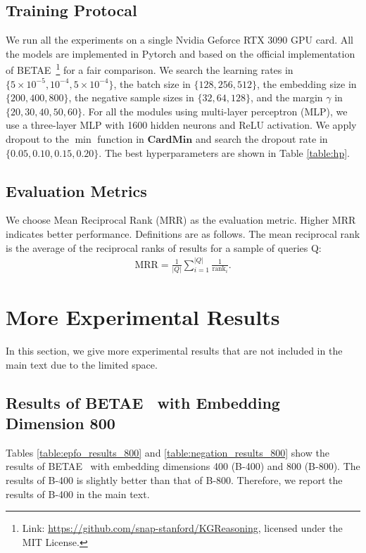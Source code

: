 \documentclass{article}
\newcommand{\betae}{{\normalsize{B}\footnotesize{ETA}\normalsize{E}}}
\begin{document}
\subsection{Training Protocal}
We run all the experiments on a single Nvidia Geforce RTX 3090 GPU card. All the models are implemented in Pytorch \cite{pytorch} and based on the official implementation of \betae~\cite{beta}\footnote{Link: \url{https://github.com/snap-stanford/KGReasoning}, licensed under the MIT License.} for a fair comparison. We search the learning rates in $\{5\times 10^{-5}, 10^{-4}, 5\times 10^{-4}\}$, the batch size in $\{128,256,512\}$, the embedding size in $\{200,400,800\}$, the negative sample sizes in $\{32,64,128\}$, and the margin $\gamma$ in $\{20,30,40,50,60\}$. For all the modules using multi-layer perceptron (MLP), we use a three-layer MLP with 1600 hidden neurons and ReLU activation. We apply dropout to the $\min$ function in $\textbf{CardMin}$ and search the dropout rate in $\{0.05,0.10,0.15,0.20\}$. The best hyperparameters are shown in Table \ref{table:hp}.

\subsection{Evaluation Metrics}
We choose Mean Reciprocal Rank (MRR) as the evaluation metric. Higher MRR  indicates better performance. Definitions are as follows. The mean reciprocal rank is the average of the reciprocal ranks of results for a sample of queries Q:
\begin{align*}
    \text{MRR}=\frac{1}{|Q|}\sum_{i=1}^{|Q|}\frac{1}{\text{rank}_i}.
\end{align*}

\section{More Experimental Results}
In this section, we give more experimental results that are not included in the main text due to the limited space.

\subsection{Results of \betae~ with Embedding Dimension 800}
Tables \ref{table:epfo_results_800} and \ref{table:negation_results_800} show the results of \betae~ with embedding dimensions 400 (B-400) and 800 (B-800). The results of B-400 is slightly better than that of B-800. Therefore, we report the results of B-400 in the main text.
\end{document}
